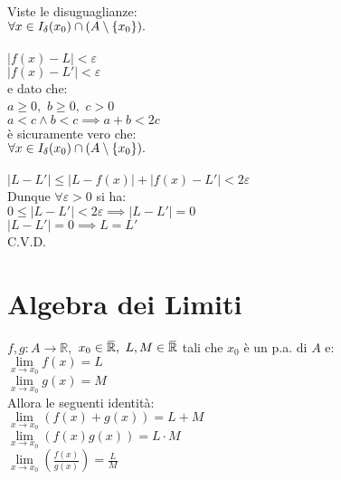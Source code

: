\documentclass[a4paper, twoside, italian, 11pt]{book}
\newcommand{\braces}[1] {\left \{ #1 \right \}}
\newcommand{\abs}[1] {\left | #1 \right |}
\newcommand{\overbar}[1] {\mkern 1.5mu\overline{\mkern-1.5mu#1\mkern-1.5mu}\mkern 1.5mu}
\newcommand{\R}{\mathbb{R}}
\begin{document}
\noindent
Viste le disuguaglianze: \\

$\forall x \in I_\delta(x_0) \cap (A \setminus \braces{x_0}) \ldotp$ \\\\
\indent
$\abs{f(x) - L} < \varepsilon$ \\
\indent
$\abs{f(x) - L'} < \varepsilon$ \\

\noindent
e dato che: \\

$a \geq 0,$ $b \geq 0,$ $c > 0$ \\
\indent
$a < c \land b < c \implies a + b < 2c$ \\

\noindent
è sicuramente vero che: \\

$\forall x \in I_\delta(x_0) \cap (A \setminus \braces{x_0}) \ldotp$ \\\\
\indent
$\abs{L - L'} \leq \abs{L - f(x)} + \abs{f(x) - L'} < 2 \varepsilon$ \\

\noindent
Dunque $\forall \varepsilon > 0$ si ha: \\

$0 \leq \abs{L - L'} < 2 \varepsilon \implies \abs{L - L'} = 0$ \\
\indent
$\abs{L - L'} = 0 \implies L = L'$ \\

C.V.D.



\section{Algebra dei Limiti}

\noindent
$f, g : A \rightarrow \R,$ $x_0 \in \overbar\R,$ $L, M \in \overbar\R$ tali che $x_0$ è un p.a. di $A$ e: \\

\noindent
$\lim\limits_{x \to x_0} f(x) = L$ \\
$\lim\limits_{x \to x_0} g(x) = M$ \\

\noindent
Allora le seguenti identità: \\
$\lim\limits_{x \to x_0} (f(x) + g(x)) = L + M$ \\
$\lim\limits_{x \to x_0} (f(x) g(x)) = L \cdot M$ \\
$\lim\limits_{x \to x_0} (\frac{f(x)}{g(x)}) = \frac{L}{M}$ \\
\end{document}
